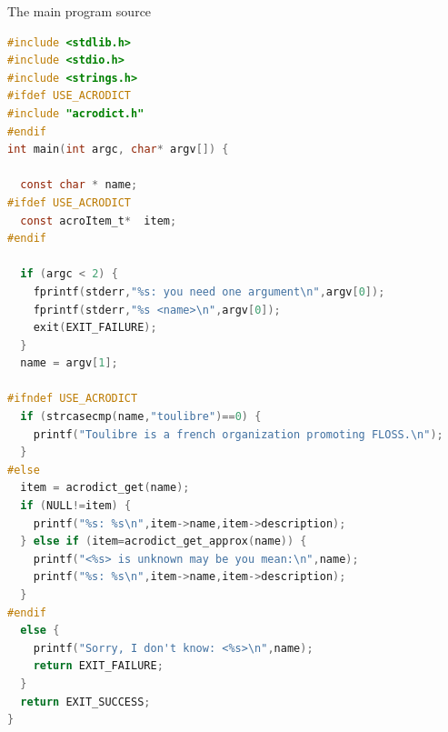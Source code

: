 \documentclass[compress,slidestop,table,usepdftitle=false
              ]
               {beamer}
\begin{document}
\begin{frame}[fragile]
\setlength{\columnsep}{0.8cm}
\vspace*{-0.5cm}
\begin{center}
The main program source
\end{center}
\begin{multicols}{2}
\begin{lstlisting}[basicstyle=\tiny,language=C,breaklines=true]
#include <stdlib.h>
#include <stdio.h>
#include <strings.h>
#ifdef USE_ACRODICT
#include "acrodict.h"
#endif
int main(int argc, char* argv[]) {

  const char * name;
#ifdef USE_ACRODICT
  const acroItem_t*  item;
#endif

  if (argc < 2) {
    fprintf(stderr,"%s: you need one argument\n",argv[0]);
    fprintf(stderr,"%s <name>\n",argv[0]);
    exit(EXIT_FAILURE);
  }
  name = argv[1];

#ifndef USE_ACRODICT
  if (strcasecmp(name,"toulibre")==0) {
    printf("Toulibre is a french organization promoting FLOSS.\n");
  }
#else
  item = acrodict_get(name);
  if (NULL!=item) {
    printf("%s: %s\n",item->name,item->description);
  } else if (item=acrodict_get_approx(name)) {
    printf("<%s> is unknown may be you mean:\n",name);
    printf("%s: %s\n",item->name,item->description);
  }
#endif
  else {
    printf("Sorry, I don't know: <%s>\n",name);
    return EXIT_FAILURE;
  }
  return EXIT_SUCCESS;
}
\end{lstlisting}
\end{multicols}
\end{frame}
\end{document}
